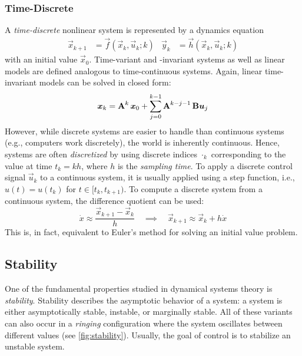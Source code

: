 			\subsubsection{Time-Discrete}
				A \emph{time-discrete} nonlinear system is represented by a dynamics equation
				\begin{align}
					\vec{x}_{k + 1} &= \vec{f}(\vec{x}_k, \vec{u}_k; k) &
					\vec{y}_k &= \vec{h}(\vec{x}_k, \vec{u}_k; k)
				\end{align}
				with an initial value \(\vec{x}_0\). Time-variant and -invariant systems as well as linear models are defined analogous to time-continuous systems. Again, linear time-invariant models can be solved in closed form:
				\begin{equation}
					\bm{x}_k = \bm{\mathrm{A}}^k\, \bm{x}_0 + \sum_{j = 0}^{k - 1} \bm{\mathrm{A}}^{k - j - 1}\, \bm{\mathrm{B}} \bm{u}_j  \label{eqn:discreteClosedForm}
				\end{equation}
				However, while discrete systems are easier to handle than continuous systems (e.g., computers work discretely), the world is inherently continuous. Hence, systems are often \emph{discretized} by using discrete indices \(\cdot_k\) corresponding to the value at time \(t_k = k h\), where \(h\) is the \emph{sampling time}. To apply a discrete control signal \( \vec{u}_k \) to a continuous system, it is usually applied using a step function, i.e., \( u(t) = u(t_k) \) for \( t \in [t_k, t_{k + 1}) \). To compute a discrete system from a continuous system, the difference quotient can be used:
				\begin{equation}
					\dot{x} \approx \frac{\vec{x}_{k + 1} - \vec{x}_k}{h}
					\quad\implies\quad
					\vec{x}_{k + 1} \approx \vec{x}_k + h \dot{x}
				\end{equation}
				This is, in fact, equivalent to Euler's method for solving an initial value problem.

		\subsection{Stability} %
			One of the fundamental properties studied in dynamical systems theory is \emph{stability}. Stability describes the asymptotic behavior of a system: a system is either asymptotically stable, instable, or marginally stable. All of these variants can also occur in a \emph{ringing} configuration where the system oscillates between different values (see \autoref{fig:stability}). Usually, the goal of control is to stabilize an unstable system.

